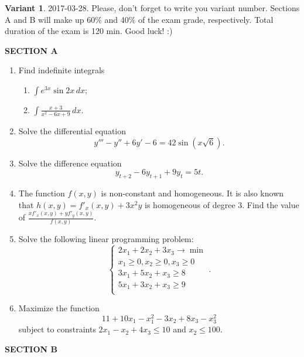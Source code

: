 \documentclass[12pt,a4paper]{article}
\begin{document}
\thispagestyle{empty}
\textbf{Variant 1}. 2017-03-28. Please, don't forget to write you variant number. Sections A and B will make up 60\% and 40\% of the exam grade, respectively. Total duration of the exam is 120 min. Good luck! :)


\textbf{SECTION A}

\begin{enumerate}

\item Find indefinite integrals
\begin{enumerate}
  \item  $\int {{e^{3x}}\sin 2x \, dx}$;
  \item  $\int {\frac{{x + 3}}{{{x^2} - 6x + 9}} \, dx}$.
\end{enumerate}

\item Solve the differential equation
\[
y''' - y'' + 6y' - 6 = 42\sin (x\sqrt 6 ).
\]

\item Solve the difference equation
\[
{y_{t + 2}} - 6{y_{t + 1}} + 9{y_t} = 5t.
\]

\item The function $f(x, y)$ is non-constant and homogeneous. It is also known that $h(x, y) = f'_x(x, y) + 3x^2y$ is homogeneous of degree 3. Find the value of $\frac{xf'_x(x, y) + yf'_y(x, y)}{f(x, y)}$.

\item Solve the following linear programming problem:
\[
\begin{cases}
2x_1 + 2x_2 + 3x_3 \to \min \\
x_1 \geq 0, x_2 \geq 0, x_3 \geq 0 \\
3x_1 + 5x_2 + x_3 \geq 8 \\
5x_1 + 3x_2 + x_3 \geq 9 \\
\end{cases}.
\]

\item Maximize the function
\[
11 + 10x_1 - x_1^2 -3x_2 + 8x_3 - x_3^2
\]
subject to constraints $2x_1 -x_2+4x_3 \leq 10$ and $x_2 \leq 100$.

\end{enumerate}

\textbf{SECTION B}
\end{document}
